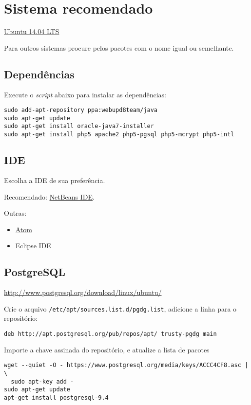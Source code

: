 \section{Sistema recomendado}

\href{http://www.ubuntu.com/download/desktop/}{Ubuntu 14.04 LTS}

Para outros sistemas procure pelos pacotes com o nome igual ou
semelhante.

\subsection{Dependências}

Execute o \emph{script} abaixo para instalar as dependências:

\begin{verbatim}
sudo add-apt-repository ppa:webupd8team/java
sudo apt-get update
sudo apt-get install oracle-java7-installer
sudo apt-get install php5 apache2 php5-pgsql php5-mcrypt php5-intl
\end{verbatim}
\subsection{IDE}

Escolha a IDE de sua preferência.

Recomendado: \href{https://netbeans.org/}{NetBeans IDE}.

Outras:

\begin{itemize}
\item
  \href{https://atom.io/}{Atom}
\item
  \href{http://eclipse.org/pdt/}{Eclipse IDE}
\end{itemize}
\subsection{PostgreSQL}

\url{http://www.postgresql.org/download/linux/ubuntu/}

Crie o arquivo \texttt{/etc/apt/sources.list.d/pgdg.list}, adicione a
linha para o repositório:

\begin{verbatim}
deb http://apt.postgresql.org/pub/repos/apt/ trusty-pgdg main
\end{verbatim}
Importe a chave assinada do repositório, e atualize a lista de pacotes

\begin{verbatim}
wget --quiet -O - https://www.postgresql.org/media/keys/ACCC4CF8.asc | \
  sudo apt-key add -
sudo apt-get update
apt-get install postgresql-9.4
\end{verbatim}
